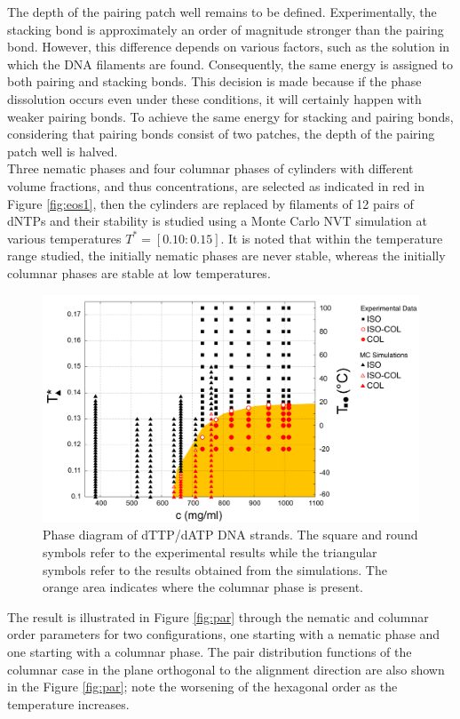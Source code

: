 \documentclass[aip,jcp, amsmath, amssymb, reprint]{revtex4-1}
\begin{document}
The depth of the pairing patch well remains to be defined. Experimentally, the stacking bond is approximately an order of magnitude stronger than the pairing bond. However, this difference depends on various factors, such as the solution in which the DNA filaments are found. Consequently, the same energy is assigned to both pairing and stacking bonds. This decision is made because if the phase dissolution occurs even under these conditions, it will certainly happen with weaker pairing bonds. To achieve the same energy for stacking and pairing bonds, considering that pairing bonds consist of two patches, the depth of the pairing patch well is halved.\\
 Three nematic phases and four columnar phases of cylinders with different volume fractions, and thus concentrations, are selected as indicated in red in Figure \ref{fig:eos1}, then the cylinders are replaced by filaments of 12 pairs of dNTPs and their stability is studied using a Monte Carlo NVT simulation at various temperatures $T^*=[0.10:0.15]$. It is noted that within the temperature range studied, the initially nematic phases are never stable, whereas the initially columnar phases are stable at low temperatures. 
 \begin{figure}[t!]
\includegraphics[width=0.7\linewidth]{finaleeng.png}
\caption{\label{fig:wide}Phase diagram of dTTP/dATP DNA strands. The square and round symbols refer to the experimental results while the triangular symbols refer to the results obtained from the simulations. The orange area indicates where the columnar phase is present.}
\end{figure}

 The result is illustrated in Figure \ref{fig:par} through the nematic and columnar order parameters for two configurations, one starting with a nematic phase and one starting with a columnar phase. The pair distribution functions of the columnar case in the plane orthogonal to the alignment direction are also shown in the Figure \ref{fig:par}; note the worsening of the hexagonal order as the temperature increases.
\end{document}
